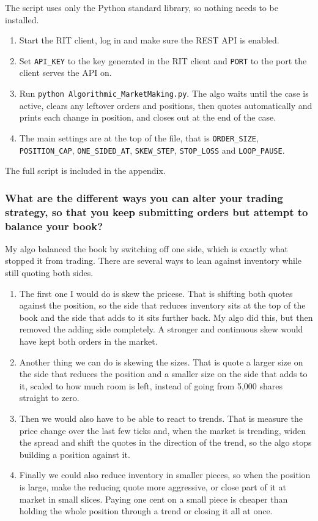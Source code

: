\documentclass{article}
\begin{document}
\noindent The script uses only the Python standard library, so nothing needs to be installed.
\begin{enumerate}
  \item Start the RIT client, log in and make sure the REST API is enabled.
  \item Set \texttt{API\_KEY} to the key generated in the RIT client and \texttt{PORT} to the port the client serves the API on.
  \item Run \texttt{python Algorithmic\_MarketMaking.py}. The algo waits until the case is active, clears any leftover orders and positions, then quotes automatically and prints each change in position, and closes out at the end of the case.
  \item The main settings are at the top of the file, that is \texttt{ORDER\_SIZE}, \texttt{POSITION\_CAP}, \texttt{ONE\_SIDED\_AT}, \texttt{SKEW\_STEP}, \texttt{STOP\_LOSS} and \texttt{LOOP\_PAUSE}.
\end{enumerate}
The full script is included in the appendix.

\subsubsection{What are the different ways you can alter your trading strategy, so that you keep submitting orders but attempt to balance your book?}

My algo balanced the book by switching off one side, which is exactly what stopped it from trading. There are several ways to lean against inventory while still quoting both sides.

\begin{enumerate}
  \item The first one I would do is skew the pricese. That is shifting both quotes against the position, so the side that reduces inventory sits at the top of the book and the side that adds to it sits further back. My algo did this, but then removed the adding side completely. A stronger and continuous skew would have kept both orders in the market.
  \item Another thing we can do is skewing the sizes. That is quote a larger size on the side that reduces the position and a smaller size on the side that adds to it, scaled to how much room is left, instead of going from 5{,}000 shares straight to zero.
  \item Then we would also have to be able to react to trends. That is measure the price change over the last few ticks and, when the market is trending, widen the spread and shift the quotes in the direction of the trend, so the algo stops building a position against it.
  \item Finally we could also reduce inventory in smaller pieces, so when the position is large, make the reducing quote more aggressive, or close part of it at market in small slices. Paying one cent on a small piece is cheaper than holding the whole position through a trend or closing it all at once.
\end{enumerate}
\end{document}
